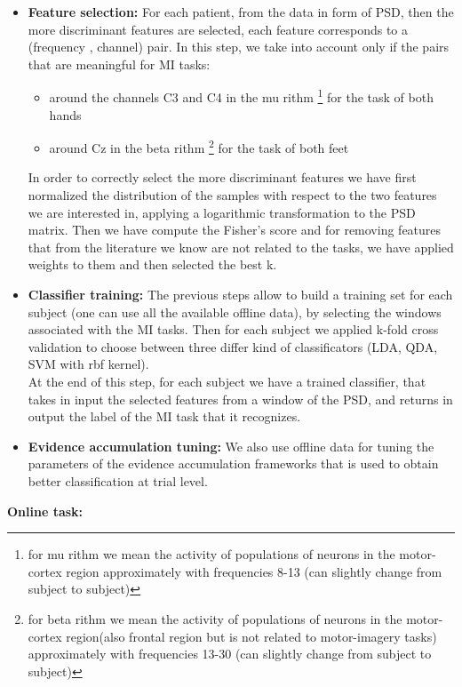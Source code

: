 \begin{itemize}
\item \textbf{Feature selection:}  For each patient, from the data in form of PSD, then the more discriminant features are selected, each feature corresponds to a (frequency , channel) pair. In this step, we take into account only if the pairs that are meaningful for MI tasks:
\begin{itemize}
\item around the channels C3 and C4 in the mu rithm
\footnote{for mu rithm we mean the activity of populations of neurons in the motor-cortex region approximately with frequencies 8-13 (can slightly change from subject to subject)}
for the task of both hands
\item around Cz in the beta rithm
\footnote{for beta rithm we mean the activity of populations of neurons in the motor-cortex region(also frontal region but is not related to motor-imagery tasks) approximately with frequencies 13-30 (can slightly change from subject to subject)}
for the task of both feet
\end{itemize}
In order to correctly select the more discriminant features we have first normalized the distribution of the samples with respect to the two features we are interested in, applying a logarithmic transformation to the PSD matrix.
Then we have compute the Fisher's score and for removing features that from the literature we know are not related to the tasks, we have applied weights to them and then selected the best k.
\item \textbf{Classifier training:} The previous steps allow to build a training set for each subject (one can use all the available offline data), by selecting the windows associated with the MI tasks. Then for each subject we applied k-fold cross validation to choose between three differ kind of classificators (LDA, QDA, SVM with rbf kernel).\\
At the end of this step, for each subject we have a trained classifier, that takes in input the selected features from a window of the PSD, and returns in output the label of the MI task that it recognizes. \\
\item \textbf{Evidence accumulation tuning:} We also use offline data for tuning the parameters of the evidence accumulation frameworks that is used to obtain better classification at trial level. 
\end{itemize}

\noindent
{\Large\textbf{Online task:}}

